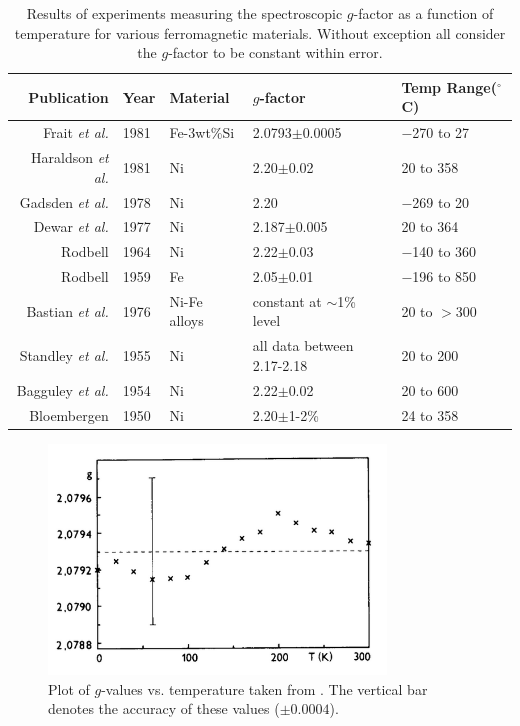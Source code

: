 \documentclass[12pt]{article}
\begin{document}
\begin{table}[h]
\begin{center}
\begin{tabular}{|r|l|l|l|l|}\hline
Publication&Year&Material&$g$-factor&Temp Range($^{\circ}$C)\\\hline
Frait {\it et al.} \cite{Pust1981}&1981&Fe-3wt\%Si&2.0793$\pm$0.0005&$-$270 to 27\\
Haraldson {\it et al.} \cite{Haraldson1981}&1981&Ni&2.20$\pm$0.02&20 to 358\\
Gadsden {\it et al.} \cite{Gadsden1978}&1978&Ni&2.20&$-$269 to 20\\
Dewar {\it et al.} \cite{Dewar1977}&1977&Ni&2.187$\pm$0.005&20 to 364\\
Rodbell \cite{Rodbell1964}&1964&Ni&2.22$\pm$0.03&$-$140 to 360\\
Rodbell \cite{Rodbell1959}&1959&Fe&2.05$\pm$0.01&$-$196 to 850\\
Bastian {\it et al.} \cite{Bastian1976_2}&1976&Ni-Fe alloys&constant at $\sim$1\% level&20 to $>$300\\
Standley {\it et al.}\cite{Standley1955}&1955&Ni&all data between 2.17-2.18&20 to 200\\
Bagguley {\it et al.}\cite{Bagguley1954}&1954&Ni&2.22$\pm$0.02&20 to 600\\
Bloembergen \cite{Bloembergen1950}&1950&Ni&2.20$\pm$1-2\%&24 to 358\\\hline

\end{tabular}
\end{center}
\caption{\label{tab:gfactor_Tdep}Results of experiments measuring the spectroscopic $g$-factor as a function of temperature for various ferromagnetic materials. Without exception all consider the $g$-factor to be constant within error.}
\end{table}

\begin{figure}[h]
\centering
\includegraphics[width=0.8\textwidth]{Frait1981.png}
\caption{Plot of $g$-values vs. temperature taken from \cite{Pust1981}. The vertical bar denotes the accuracy of these values ($\pm0.0004$). }
\label{fig:Frait1981}
\end{figure}
\end{document}
